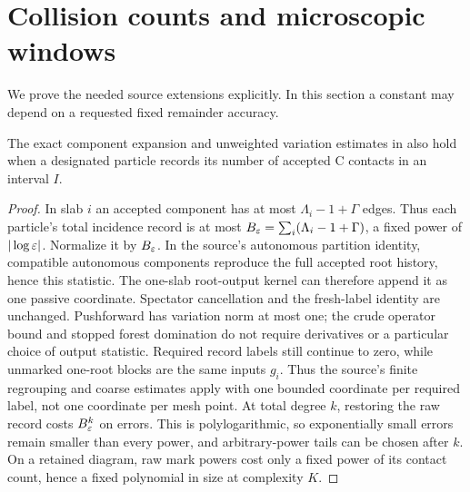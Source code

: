 \section{Collision counts and microscopic windows}\label{sec:micro}
We prove the needed source extensions explicitly. In this section a
constant may depend on a requested fixed remainder accuracy.

\begin{lemma}\label{lem:record}
The exact component expansion and unweighted variation estimates in
 also hold when a designated particle records its
number of accepted C contacts in an interval $I$.
\end{lemma}
\begin{proof}
In slab $i$ an accepted component has at most
$\Lambda_i-1+\Gamma$ edges. Thus each particle's total incidence record
is at most $B_\varepsilon=\sum_i(\Lambda_i-1+\Gamma)$, a fixed power of
$|\log\varepsilon|$. Normalize it by $B_\varepsilon$.
In the source's autonomous partition identity, compatible autonomous
components reproduce the full accepted root history, hence this statistic.
The one-slab root-output kernel can therefore append it as one passive
coordinate. Spectator cancellation and the fresh-label identity are
unchanged. Pushforward has variation norm at most one; the crude operator
bound and stopped forest domination do not require derivatives or a
particular choice of output statistic.
Required record labels still continue to zero, while unmarked one-root
blocks are the same inputs $g_i$. Thus the source's finite regrouping and
coarse estimates apply with one bounded coordinate per required label,
not one coordinate per mesh point.
At total degree $k$, restoring the raw record costs $B_\varepsilon^k$ on errors.
This is polylogarithmic, so exponentially small errors remain smaller than
every power, and arbitrary-power tails can be chosen after $k$.
On a retained diagram, raw mark powers cost only a fixed power of its
contact count, hence a fixed polynomial in size at complexity $K$.
\end{proof}

